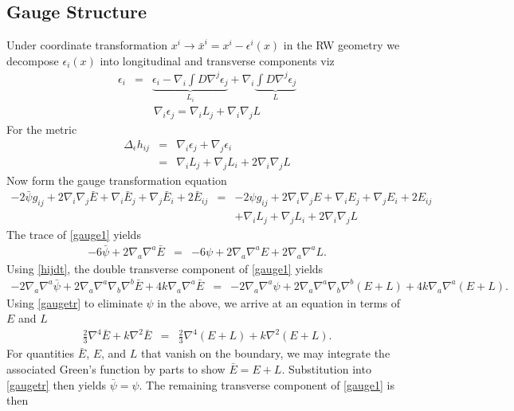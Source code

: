 \documentclass[10pt,letterpaper]{article}
\numberwithin{equation}{section}
\begin{document}
\subsection{Gauge Structure}
\label{Gauge Transformations}
Under coordinate transformation $x^i \to \bar x^i = x^i - \epsilon^i (x)$ in the RW geometry we decompose $\epsilon_i(x)$ into longitudinal and transverse components viz
\begin{eqnarray}
\epsilon_i &=&  \underbrace{\epsilon_i - \nabla_i \int D \nabla^j \epsilon_j}_{L_i} + \nabla_i \underbrace{\int D\nabla^j \epsilon_j}_{L}
\end{eqnarray}
\begin{eqnarray}
\nabla_i \epsilon_j = \nabla_i L_j + \nabla_i\nabla_j L
\end{eqnarray}
For the metric
\begin{eqnarray}
\Delta_\epsilon h_{ij} &=& \nabla_i \epsilon_j + \nabla_j \epsilon_i
\nonumber\\
&=& \nabla_i L_j + \nabla_j L_i + 2\nabla_i\nabla_j L
\end{eqnarray}
Now form the gauge transformation equation
\begin{eqnarray}
-2\bar\psi g_{ij} + 2\nabla_i \nabla_j \bar E + \nabla_i \bar E_j +\nabla_j \bar E_i + 2\bar E_{ij}
&=& -2\psi g_{ij} + 2\nabla_i \nabla_j  E + \nabla_i  E_j +\nabla_j E_i + 2 E_{ij}
\nonumber\\
&&+ \nabla_i L_j + \nabla_j L_i + 2\nabla_i\nabla_j L
\label{gauge1}
\end{eqnarray}
The trace of \eqref{gauge1} yields
\begin{eqnarray}
-6\bar\psi + 2\nabla_a\nabla^a \bar E &=& -6\psi + 2\nabla_a\nabla^a E + 2\nabla_a \nabla^a L.
\label{gaugetr}
\end{eqnarray}
Using \eqref{hijdt}, the double transverse component of \eqref{gauge1} yields
\begin{eqnarray}
-2\nabla_a\nabla^a\bar \psi + 2\nabla_a\nabla^a\nabla_b\nabla^b \bar E + 4k \nabla_a\nabla^a \bar E&=& -2\nabla_a\nabla^a\psi + 2\nabla_a\nabla^a\nabla_b\nabla^b (E+L) + 4k \nabla_a\nabla^a (E+L).
\end{eqnarray}
Using \eqref{gaugetr} to eliminate $\psi$ in the above, we arrive at an equation in terms of $E$ and $L$
\begin{eqnarray}
\tfrac23 \nabla^4\bar E + k\nabla^2\bar E &=& \tfrac23 \nabla^4 (E+L) + k\nabla^2 (E+L).
\end{eqnarray}
For quantities $\bar E$, $E$, and $L$ that vanish on the boundary, we may integrate the associated Green's function by parts to show $\bar E = E+L$. Substitution into \eqref{gaugetr} then yields $\bar\psi = \psi$. The remaining transverse component of \eqref{gauge1} is then
\end{document}
